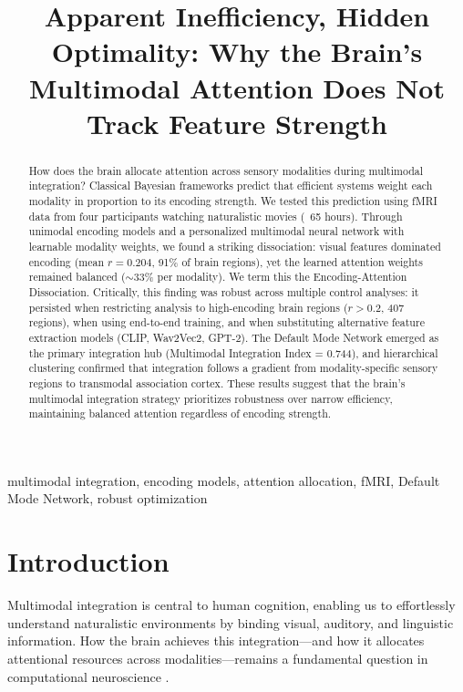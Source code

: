 \documentclass[conference]{IEEEtran}
\begin{document}
\title{Apparent Inefficiency, Hidden Optimality: Why the Brain's Multimodal Attention Does Not Track Feature Strength}

\author{
}

\maketitle

\begin{abstract}
How does the brain allocate attention across sensory modalities during multimodal integration? Classical Bayesian frameworks predict that efficient systems weight each modality in proportion to its encoding strength. We tested this prediction using fMRI data from four participants watching naturalistic movies (~65 hours). Through unimodal encoding models and a personalized multimodal neural network with learnable modality weights, we found a striking dissociation: visual features dominated encoding (mean $r = 0.204$, 91\% of brain regions), yet the learned attention weights remained balanced ($\sim$33\% per modality). We term this the Encoding-Attention Dissociation. Critically, this finding was robust across multiple control analyses: it persisted when restricting analysis to high-encoding brain regions ($r > 0.2$, 407 regions), when using end-to-end training, and when substituting alternative feature extraction models (CLIP, Wav2Vec2, GPT-2). The Default Mode Network emerged as the primary integration hub (Multimodal Integration Index = 0.744), and hierarchical clustering confirmed that integration follows a gradient from modality-specific sensory regions to transmodal association cortex. These results suggest that the brain's multimodal integration strategy prioritizes robustness over narrow efficiency, maintaining balanced attention regardless of encoding strength.
\end{abstract}

\begin{IEEEkeywords}
multimodal integration, encoding models, attention allocation, fMRI, Default Mode Network, robust optimization
\end{IEEEkeywords}

\section{Introduction}

Multimodal integration is central to human cognition, enabling us to effortlessly understand naturalistic environments by binding visual, auditory, and linguistic information. How the brain achieves this integration---and how it allocates attentional resources across modalities---remains a fundamental question in computational neuroscience \cite{stein1993merging, beauchamp2004unraveling}.
\end{document}
